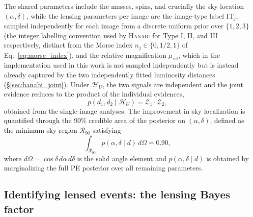 The shared parameters include the masses, spins, and
crucially the sky location $(\alpha, \delta)$, while
the lensing parameters per image are the image-type
label $\mathrm{IT}_j$, sampled independently for each
image from a discrete uniform prior over $\{1, 2, 3\}$
(the integer labelling convention used by
\textsc{Hanabi} for Type I, II, and III respectively,
distinct from the Morse index $n_j \in \{0, 1/2, 1\}$
of Eq.~\eqref{eq:morse_index}), and the
relative magnification $\mu_\mathrm{rel}$, which in
the implementation used in this work is not sampled
independently but is instead already captured by the
two independently fitted luminosity distances
(\S\ref{sec:hanabi_joint}). Under $\mathcal{H}_U$,
the two signals are independent and the joint evidence 
reduces to the product of the individual evidences,
\begin{equation}
    p(d_1, d_2 \mid \mathcal{H}_U) = 
    \mathcal{Z}_1 \cdot \mathcal{Z}_2,
    \label{eq:joint_evidence_unlensed}
\end{equation}
obtained from the single-image analyses. The improvement 
in sky localization is quantified through the 90\% 
credible area of the posterior on $(\alpha, \delta)$, 
defined as the minimum sky region $\mathcal{R}_{90}$ 
satisfying
\begin{equation}
    \int_{\mathcal{R}_{90}} p(\alpha, \delta \mid d)\, 
    d\Omega = 0.90,
    \label{eq:sky_area}
\end{equation}
where $d\Omega = \cos\delta\, d\alpha\, d\delta$ is 
the solid angle element and $p(\alpha, \delta \mid d)$ 
is obtained by marginalizing the full PE posterior 
over all remaining parameters.

\subsection{Identifying lensed events: the lensing Bayes 
factor}
\label{sec:lensing_bayes_factor}

